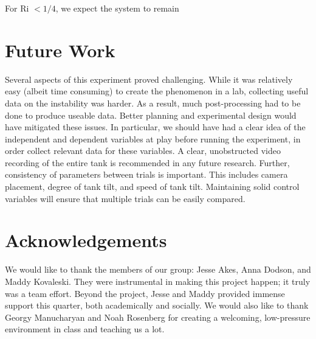 \documentclass{article}
\begin{document}
For Ri \(< 1/4\), we expect the system to remain 

\section{Future Work}

Several aspects of this experiment proved challenging. While it was relatively
easy (albeit time consuming) to create the phenomenon in a lab, collecting
useful data on the instability was harder. As a result, much post-processing had
to be done to produce useable data. Better planning and experimental design
would have mitigated these issues. In particular, we should have had a clear
idea of the independent and dependent variables at play before running the
experiment, in order collect relevant data for these variables. A clear,
unobstructed video recording of the entire tank is recommended in any future
research. Further, consistency of parameters between trials is important. This
includes camera placement, degree of tank tilt, and speed of tank tilt.
Maintaining solid control variables will ensure that multiple trials can be
easily compared.

\section{Acknowledgements}

We would like to thank the members of our group: Jesse Akes, Anna Dodson, and
Maddy Kovaleski. They were instrumental in making this project happen; it truly
was a team effort. Beyond the project, Jesse and Maddy provided immense support
this quarter, both academically and socially. We would also like to thank Georgy
Manucharyan and Noah Rosenberg for creating a welcoming, low-pressure
environment in class and teaching us a lot.  

\newpage
{}

\end{document}
